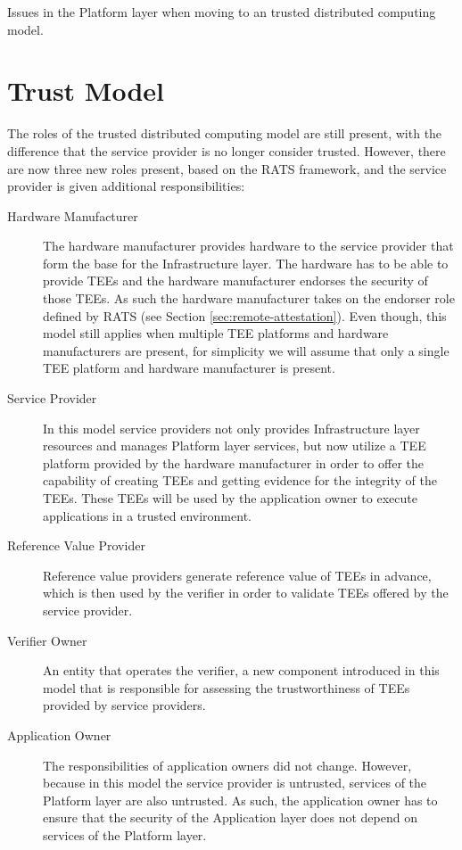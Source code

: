 \begin{table}[H]
  \centering
  \scriptsize
  
  \caption{Issues in the Platform layer when moving to an trusted distributed computing model.}
\end{table}

\section{Trust Model}

The roles of the trusted distributed computing model are still present, with the
difference that the service provider is no longer consider trusted. However,
there are now three new roles present, based on the RATS framework, and the
service provider is given additional responsibilities:

\begin{description}
  \item[Hardware Manufacturer]
    The hardware manufacturer provides hardware to the service provider that
    form the base for the Infrastructure layer. The hardware has to be able to
    provide TEEs and the hardware manufacturer endorses the security of those
    TEEs. As such the hardware manufacturer takes on the endorser role defined
    by RATS (see Section \ref{sec:remote-attestation}). Even though, this model
    still applies when multiple TEE platforms and hardware manufacturers are
    present, for simplicity we will assume that only a single TEE platform and
    hardware manufacturer is present.

  \item[Service Provider]
    In this model service providers not only provides Infrastructure layer
    resources and manages Platform layer services, but now utilize a TEE
    platform provided by the hardware manufacturer in order to offer the
    capability of creating TEEs and getting evidence for the integrity of the
    TEEs. These TEEs will be used by the application owner to execute
    applications in a trusted environment.

  \item[Reference Value Provider]
    Reference value providers generate reference value of TEEs in advance,
    which is then used by the verifier in order to validate TEEs offered by the
    service provider.

  \item[Verifier Owner]
    An entity that operates the verifier, a new component introduced in this
    model that is responsible for assessing the trustworthiness of TEEs provided
    by service providers.

  \item[Application Owner]
    The responsibilities of application owners did not change. However, because
    in this model the service provider is untrusted, services of the Platform
    layer are also untrusted. As such, the application owner has to ensure that
    the security of the Application layer does not depend on services of the
    Platform layer.
\end{description}

